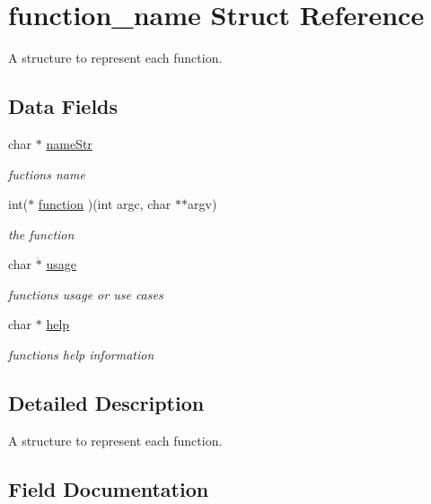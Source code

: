 \hypertarget{structfunction__name}{}\section{function\+\_\+name Struct Reference}
\label{structfunction__name}


A structure to represent each function.  


\subsection*{Data Fields}
\begin{DoxyCompactItemize}
\item 
char $\ast$ \hyperlink{structfunction__name_a7a94f7f31542a15b63160b6b213e0bcb}{name\+Str}
\begin{DoxyCompactList}\small\item\em fuction\textquotesingle{}s name \end{DoxyCompactList}\item 
int($\ast$ \hyperlink{structfunction__name_ad80214b3eea6c438c13ff5461c5350ab}{function} )(int argc, char $\ast$$\ast$argv)
\begin{DoxyCompactList}\small\item\em the function \end{DoxyCompactList}\item 
char $\ast$ \hyperlink{structfunction__name_a30f593e52febda0cc9d9703b9015fb0f}{usage}
\begin{DoxyCompactList}\small\item\em function\textquotesingle{}s usage or use cases \end{DoxyCompactList}\item 
char $\ast$ \hyperlink{structfunction__name_ac0f73e570d7d03a9f378a70e6d4d5632}{help}
\begin{DoxyCompactList}\small\item\em function\textquotesingle{}s help information \end{DoxyCompactList}\end{DoxyCompactItemize}


\subsection{Detailed Description}
A structure to represent each function. 

\subsection{Field Documentation}
